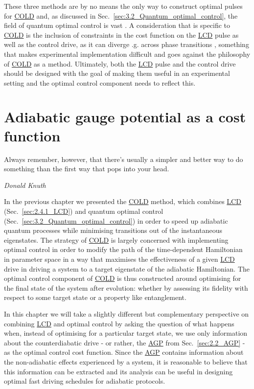 \documentclass[a4paper,oneside,11pt]{book}
\newcommand{\acrref}[1]{\hyperref[acr:#1]{#1}}
\providecommand{\DIFaddtex}[1]{{\protect\color{blue}\uwave{#1}}} %
\providecommand{\DIFaddbegin}{} %
\providecommand{\DIFaddend}{} %
\providecommand{\DIFadd}[1]{\texorpdfstring{\DIFaddtex{#1}}{#1}} %
\newcommand{\DIFaddincludegraphics}[2][]{{\color{blue}\fbox{\DIFOincludegraphics[#1]{#2}}}} %
\DeclareRobustCommand{\DIFaddbegin}{\DIFOaddbegin \let\includegraphics\DIFaddincludegraphics} %
\DeclareRobustCommand{\DIFaddend}{\DIFOaddend \let\includegraphics\DIFOincludegraphics} %
\begin{document}
These three methods are by no means the only way to construct optimal pulses for \acrref{COLD} and, as discussed in Sec.~\ref{sec:3.2_Quantum_optimal_control}, the field of quantum optimal control is vast \DIFaddbegin \DIFadd{\mbox{%
\cite{koch_quantum_2022}}\hskip0pt%
}\DIFaddend . A consideration that is specific to \acrref{COLD} is the inclusion of constraints in the cost function on the \acrref{LCD} pulse as well as the control drive, as it can diverge \@e.g. across phase transitions \cite{hatomura_controlling_2021}, something that makes experimental implementation difficult and goes against the philosophy of \acrref{COLD} as a method. Ultimately, both the \acrref{LCD} pulse and the control drive should be designed with the goal of making them useful in an experimental setting and the optimal control component needs to reflect this. 
\chapter{Adiabatic gauge potential as a cost function}\label{chap:5_cd_as_costfunc}

\epigraph{Always remember, however, that there’s usually a simpler and better way to do something than the first way that pops into your head.}{\emph{Donald Knuth}}

In the previous chapter we presented the \acrref{COLD} method, which combines \acrref{LCD} (Sec.~\ref{sec:2.4.1_LCD}) and quantum optimal control (Sec.~\ref{sec:3.2_Quantum_optimal_control}) in order to speed up adiabatic quantum processes while minimising transitions out of the instantaneous eigenstates. The strategy of \acrref{COLD} is largely concerned with implementing optimal control in order to modify the path of the time-dependent Hamiltonian in parameter space in a way that maximises the effectiveness of a given \acrref{LCD} drive in driving a system to a target eigenstate of the adiabatic Hamiltonian. The optimal control component of \acrref{COLD} is thus constructed around optimising for the final state of the system after evolution: whether by assessing its fidelity with respect to some target state or a property like entanglement.

In this chapter we will take a slightly different but complementary perspective on combining \acrref{LCD} and optimal control by asking the question of what happens when, instead of optimising for a particular target state, we use only information about the counterdiabatic drive - or rather, the \acrref{AGP} from Sec.~\ref{sec:2.2_AGP} - as the optimal control cost function. Since the \acrref{AGP} contains information about the non-adiabatic effects experienced by a system, it is reasonable to believe that this information can be extracted and its analysis can be useful in designing optimal fast driving schedules for adiabatic protocols. 
\end{document}
